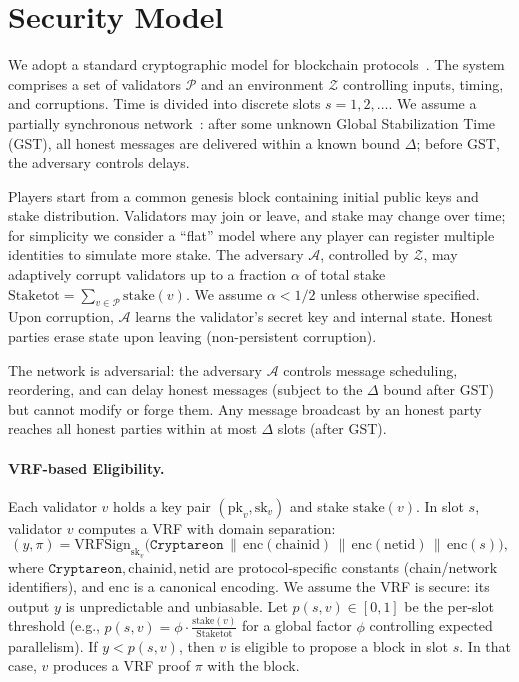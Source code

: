 \documentclass[11pt]{article}
\newcommand{\cZ}{\ensuremath{\mathscr{Z}}\xspace}
\newcommand{\cA}{\ensuremath{\mathscr{A}}\xspace}
\newcommand{\cP}{\ensuremath{\mathscr{P}}\xspace}
\newcommand{\pk}{\ensuremath{\mathrm{pk}}\xspace}
\newcommand{\sk}{\ensuremath{\mathrm{sk}}\xspace}
\newcommand{\stake}{\ensuremath{\mathrm{stake}}\xspace}
\newcommand{\StakeTot}{\ensuremath{\mathrm{Stake}{\mathrm{tot}}}\xspace}
\newcommand{\stakefrac}[1]{\ensuremath{\frac{\stake(#1)}{\StakeTot}}\xspace}
\newcommand{\VRFSign}{\ensuremath{\mathrm{VRFSign}}\xspace}
\newcommand{\domsep}{\ensuremath{\mathtt{Cryptareon}}\xspace}
\newcommand{\chainid}{\ensuremath{\mathrm{chainid}}\xspace}
\newcommand{\netid}{\ensuremath{\mathrm{netid}}\xspace}
\newcommand{\Encode}{\ensuremath{\mathrm{enc}}\xspace}
\begin{document}
\section{Security Model}
\label{sec:model}

We adopt a standard cryptographic model for blockchain protocols~\cite{EC:GarKiaLeo15,EC:PasSeeShe17,JC:Canetti00}. The system comprises a set of validators $\cP$ and an environment $\cZ$ controlling inputs, timing, and corruptions. Time is divided into discrete slots $s=1,2,\ldots$. We assume a partially synchronous network~\cite{DLS88,EC:PasSeeShe17}: after some unknown Global Stabilization Time (GST), all honest messages are delivered within a known bound $\Delta$; before GST, the adversary controls delays. 

Players start from a common genesis block containing initial public keys and stake distribution. Validators may join or leave, and stake may change over time; for simplicity we consider a “flat” model where any player can register multiple identities to simulate more stake. The adversary $\cA$, controlled by $\cZ$, may adaptively corrupt validators up to a fraction $\alpha$ of total stake $\StakeTot=\sum_{v\in\cP}\stake(v)$. We assume $\alpha < 1/2$ unless otherwise specified. Upon corruption, $\cA$ learns the validator's secret key and internal state. Honest parties erase state upon leaving (non-persistent corruption).

The network is adversarial: the adversary $\cA$ controls message scheduling, reordering, and can delay honest messages (subject to the $\Delta$ bound after GST) but cannot modify or forge them. Any message broadcast by an honest party reaches all honest parties within at most $\Delta$ slots (after GST). 

\paragraph{VRF-based Eligibility.} Each validator $v$ holds a key pair $(\pk_v,\sk_v)$ and stake $\stake(v)$. In slot $s$, validator $v$ computes a VRF with domain separation:
\begin{equation*}
(y,\pi) = \VRFSign_{\sk_v}\bigl(\domsep \,\|\, \Encode(\chainid)\,\|\,\Encode(\netid)\,\|\,\Encode(s)\bigr),
\end{equation*}
where $\domsep,\chainid,\netid$ are protocol-specific constants (chain/network identifiers), and $\Encode$ is a canonical encoding. We assume the VRF is secure: its output $y$ is unpredictable and unbiasable. Let $p(s,v)\in[0,1]$ be the per-slot threshold (e.g., $p(s,v) = \phi\cdot \stakefrac{v}$ for a global factor $\phi$ controlling expected parallelism). If $y < p(s,v)$, then $v$ is eligible to propose a block in slot $s$. In that case, $v$ produces a VRF proof $\pi$ with the block.
\end{document}
